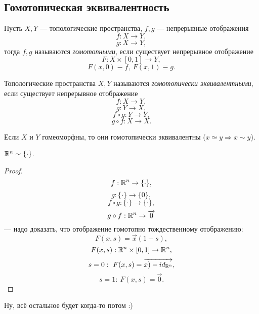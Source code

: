 \subsection{Гомотопическая эквивалентность}
\begin{definition}
    Пусть $X,Y$ — топологические пространства, $f,g$ — непрерывные отображения
    \[f: X \to Y,\]
    \[g: X \to Y,\]
    тогда $f,g$ называются \textit{гомотопными}, если существует непрерывное отображение 
    \[F: X \times [0,1] \to Y,\]
    \[F(x,0) \equiv f, \ F(x,1) \equiv g.\]
\end{definition} 

\begin{definition}
    Топологические пространства $X,Y$ называются \textit{гомотопически эквивалентными}, если существует непрерывное отображение 
    \[f: X \to Y,\]
    \[g: Y \to X,\]
    \[f \circ g: Y \to Y,\]
    \[g \circ f: X \to X.\]
\end{definition} 

\begin{statement}
    Если $X$ и $Y$ гомеоморфны, то они гомотопически эквивалентны ($x \simeq y \Longrightarrow x \sim y$).
\end{statement} 

\begin{statement}
    $\mathbb{R}^n \sim \{\cdot\}$.
\end{statement} 
\begin{proof}
    \[f: \mathbb{R}^n \to \{\cdot\},\]
    \[g: \{\cdot\} \to \{0\},\]
    \[f \circ g: \{\cdot\} \to \{\cdot\},\]
    \[g \circ f: \mathbb{R}^n \to \overrightarrow{0}\]
    — надо доказать, что отображение гомотопно тождественному отображению:
    \[F(x,s) = \overrightarrow{x}(1-s),\]
    \[F(x,s): \mathbb{R}^n \times [0,1] \to \mathbb{R}^n,\]
    \[s=0: \ F(x,s) = \overrightarrow{x) - id_{\mathbb{R}^n}},\]
    \[s=1: \ F(x,s) = \overrightarrow{0}.\]
\end{proof} 

Ну, всё остальное будет когда-то потом :)